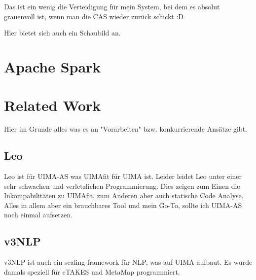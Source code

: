Das ist ein wenig die Verteidigung für mein System, bei dem es absolut grauenvoll ist, wenn man die CAS wieder zurück schickt :D

Hier bietet sich auch ein Schaubild an.

\section{Apache Spark}


\section{Related Work}
\label{sec:related}
Hier im Grunde alles was es an "Vorarbeiten" bzw. konkurrierende Ansätze gibt.

\subsection{Leo}
\label{ssec:leo}
Leo ist für UIMA-AS was UIMAfit für UIMA ist. Leider leidet Leo unter einer sehr schwachen und verletzlichen Programmierung. Dies zeigen zum Einen die Inkompabilitäten zu UIMAfit, zum Anderen aber auch statische Code Analyse. Alles in allem aber ein brauchbares Tool und mein Go-To, sollte ich UIMA-AS noch einmal aufsetzen.

\subsection{v3NLP}
v3NLP ist auch ein scaling framework für NLP, was auf UIMA aufbaut. Es wurde damals speziell für cTAKES und MetaMap programmiert.



% 
% 
% 
